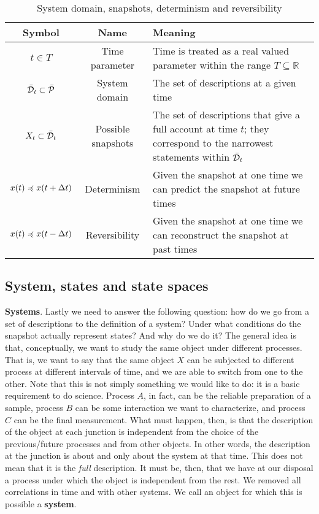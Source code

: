 \documentclass[10pt, onecolumn, longbibliography, nofootinbib]{revtex4-2}
\begin{document}
\begin{table}[h!]
	\centering
	\begin{tabular}{|c|c|p{6cm}|}
		\hline 
		Symbol & Name & Meaning \\ 
		\hline 
		$t \in T$ & Time parameter & Time is treated as a real valued parameter within the range $T \subseteq \mathbb{R}$ \\ 
		\hline 
		$\tdomain_t \subset \tdomain[P]$ & System domain & The set of descriptions at a given time \\ 
		\hline 
		$X_t \subset \tdomain_t$ & Possible snapshots & The set of descriptions that give a full account at time $t$; they correspond to the narrowest statements within $\tdomain_t$ \\ 
		\hline 
		$x(t) \narrower x(t + \Delta t)$ & Determinism & Given the snapshot at one time we can predict the snapshot at future times \\ 
		\hline 
		$x(t) \narrower x(t - \Delta t)$ & Reversibility & Given the snapshot at one time we can reconstruct the snapshot at past times \\ 
		\hline 
	\end{tabular} 
	\caption{System domain, snapshots, determinism and reversibility}
	\label{table:states}
\end{table}


\subsection{System, states and state spaces}

\textbf{Systems}. Lastly we need to answer the following question: how do we go from a set of descriptions to the definition of a system? Under what conditions do the snapshot actually represent states? And why do we do it? The general idea is that, conceptually, we want to study the same object under different processes. That is, we want to say that the same object $X$ can be subjected to different process at different intervals of time, and we are able to switch from one to the other. Note that this is not simply something we would like to do: it is a basic requirement to do science. Process $A$, in fact, can be the reliable preparation of a sample, process $B$ can be some interaction we want to characterize, and process $C$ can be the final measurement. What must happen, then, is that the description of the object at each junction is independent from the choice of the previous/future processes and from other objects. In other words, the description at the junction is about and only about the system at that time. This does not mean that it is the \emph{full} description. It must be, then, that we have at our disposal a process under which the object is independent from the rest. We removed all correlations in time and with other systems. We call an object for which this is possible a \textbf{system}.
\end{document}
